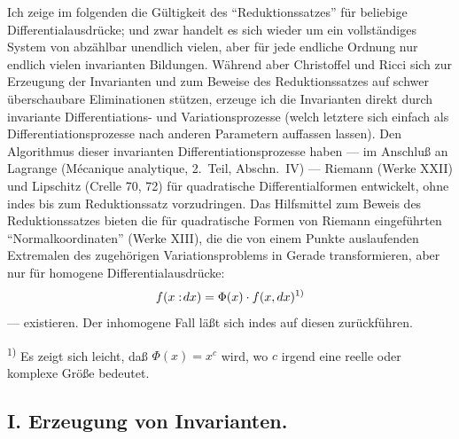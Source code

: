 \documentclass[12pt,a4paper]{article}
\begin{document}
Ich zeige im folgenden die G\"ultigkeit des ``Reduktionssatzes'' f\"ur beliebige Differentialausdr\"ucke; und zwar handelt es sich wieder um ein vollst\"andiges System von abz\"ahlbar unendlich vielen, aber f\"ur jede endliche Ordnung nur endlich vielen invarianten Bildungen. W\"ahrend aber Christoffel und Ricci sich zur Erzeugung der Invarianten und zum Beweise des Reduktionssatzes auf schwer \"uberschaubare Eliminationen st\"utzen, erzeuge ich die Invarianten direkt durch invariante Differentiations- und Variationsprozesse (welch letztere sich einfach als Differentiationsprozesse nach anderen Parametern auffassen lassen). Den Algorithmus dieser invarianten Differentiationsprozesse haben --- im Anschlu\ss{} an Lagrange (M\'ecanique analytique, 2.\ Teil, Abschn.\ IV) --- Riemann (Werke XXII) und Lipschitz (Crelle 70, 72) f\"ur quadratische Differentialformen entwickelt, ohne indes bis zum Reduktionssatz vorzudringen. Das Hilfsmittel zum Beweis des Reduktionssatzes bieten die f\"ur quadratische Formen von Riemann eingef\"uhrten ``Normalkoordinaten'' (Werke XIII), die die von einem Punkte auslaufenden Extremalen des zugeh\"origen Variationsproblems in Gerade transformieren, aber nur f\"ur homogene Differentialausdr\"ucke:
\[
f(x:\!dx)=\Phi(x)\cdot f(x,dx)\text{\textsuperscript{1)}}
\]
--- existieren. Der inhomogene Fall l\"a\ss{}t sich indes auf diesen zur\"uckf\"uhren.

\smallskip
\noindent\textsuperscript{1)} Es zeigt sich leicht, da\ss{} $\Phi(x)=x^{c}$ wird, wo $c$ irgend eine reelle oder komplexe Gr\"o\ss{}e bedeutet.

\subsection*{I. Erzeugung von Invarianten.}
\end{document}
